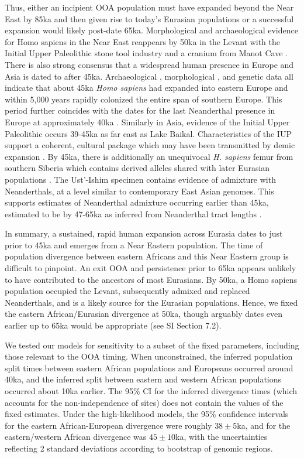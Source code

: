 \documentclass[]{article}
\begin{document}
Thus, either an incipient OOA population must have expanded beyond the Near
East by 85ka and then given rise to today’s Eurasian populations or a
successful expansion would likely post-date 65ka. Morphological and
archaeological evidence for Homo sapiens in the Near East reappears by 50ka in
the Levant with the Initial Upper Paleolithic stone tool industry
\citep{Boaretto2021-oi} and a cranium from Manot Cave
\citep{Hershkovitz2015-lq}. There is also strong consensus that a widespread
human presence in Europe and Asia is dated to after 45ka. Archaeological
\citep[e.g.,][]{Fewlass2020-se}, morphological \citep[e.g.,][]{Hublin2020-nk},
and genetic data \citep[e.g.,][]{Prufer2021-ao} all indicate that about 45ka
\emph{Homo sapiens} had expanded into eastern Europe and within 5,000 years
rapidly colonized the entire span of southern Europe. This period further
coincides with the dates for the last Neanderthal presence in Europe at
approximately 40ka \citep{Deviese2017-de,Hublin2017-uy}. Similarly in Asia,
evidence of the Initial Upper Paleolithic occurs 39-45ka as far east as Lake
Baikal. Characteristics of the IUP support a coherent, cultural package which
may have been transmitted by demic expansion \citep{Kuhn2014-kj,Zwyns2021-zv}.
By 45ka, there is additionally an unequivocal \emph{H. sapiens} femur from
southern Siberia which contains derived alleles shared with later Eurasian
populations \citep{Fu2014-am}. The Ust’-Ishim
specimen contains evidence of admixture with Neanderthals, at a level similar
to contemporary East Asian genomes. This supports estimates of Neanderthal
admixture occurring earlier than 45ka, estimated to be by 47-65ka as inferred
from Neanderthal tract lengths \citep{Sankararaman2012-uw}.

In summary, a sustained, rapid human expansion across Eurasia dates to just
prior to 45ka and emerges from a Near Eastern population. The time of
population divergence between eastern Africans and this Near Eastern group is
difficult to pinpoint. An exit OOA and persistence prior to 65ka appears
unlikely to have contributed to the ancestors of most Eurasians. By 50ka, a
Homo sapiens population occupied the Levant, subsequently admixed and replaced
Neanderthals, and is a likely source for the Eurasian populations. Hence, we
fixed the eastern African/Eurasian divergence at 50ka, though arguably dates
even earlier up to 65ka would be appropriate (see SI Section 7.2). 

We tested our models for sensitivity to a subset of the fixed parameters,
including those relevant to the OOA timing. When unconstrained, the inferred
population split times between eastern African populations and Europeans
occurred around 40ka, and the inferred split between eastern and western
African populations occurred about 10ka earlier. The 95\% CI for the inferred
divergence times (which accounts for the non-independence of sites) does not
contain the values of the fixed estimates. Under the high-likelihood models,
the 95\% confidence intervals for the eastern African-European divergence were
roughly $38\pm5$ka, and for the eastern/western African divergence was
$45\pm10$ka, with the uncertainties reflecting 2 standard deviations according
to bootstrap of genomic regions.
\end{document}
